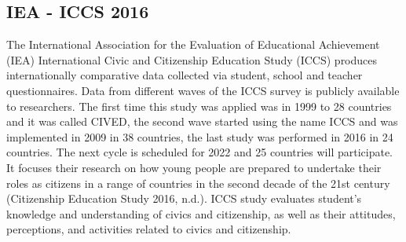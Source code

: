 \documentclass[12pt,a4paper,oneside]{reedthesis}
\begin{document}
\hypertarget{iea---iccs-2016}{%
\subsection{IEA - ICCS 2016}\label{iea---iccs-2016}}

The International Association for the Evaluation of Educational Achievement (IEA) International Civic and Citizenship Education Study (ICCS) produces internationally comparative data collected via student, school and teacher questionnaires. Data from different waves of the ICCS survey is publicly available to researchers. The first time this study was applied was in 1999 to 28 countries and it was called CIVED, the second wave started using the name ICCS and was implemented in 2009 in 38 countries, the last study was performed in 2016 in 24 countries. The next cycle is scheduled for 2022 and 25 countries will participate. It focuses their research on how young people are prepared to undertake their roles as citizens in a range of countries in the second decade of the 21st century (Citizenship Education Study 2016, n.d.). ICCS study evaluates student's knowledge and understanding of civics and citizenship, as well as their attitudes, perceptions, and activities related to civics and citizenship.
\end{document}
